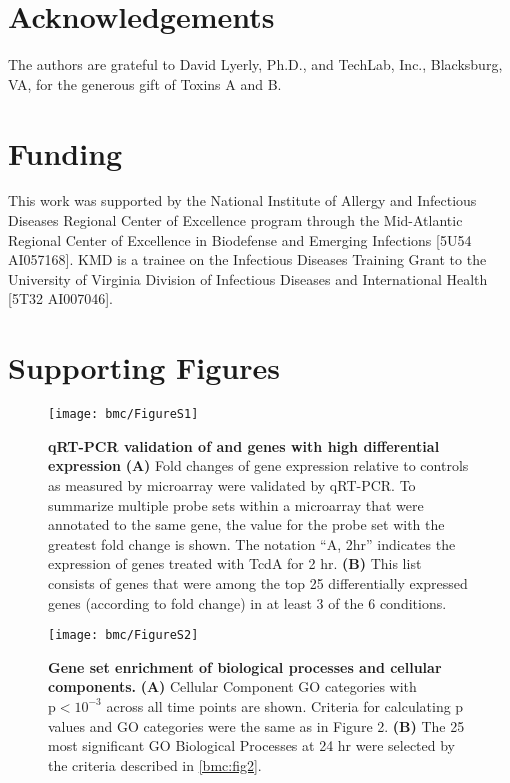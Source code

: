 \section{Acknowledgements}
The authors are grateful to David Lyerly, Ph.D., and TechLab, Inc., Blacksburg, VA, for the generous gift of Toxins A and B.

\section{Funding}
This work was supported by the National Institute of Allergy and Infectious Diseases Regional Center of Excellence program through the Mid-Atlantic Regional Center of Excellence in Biodefense and Emerging Infections [5U54 AI057168]. KMD is a trainee on the Infectious Diseases Training Grant to the University of Virginia Division of Infectious Diseases and International Health [5T32 AI007046].


\section{Supporting Figures}
\beginsupplement

\begin{figure}[h!]
  \centering
  \texttt{[image: bmc/FigureS1]}
  \caption[qRT-PCR validation of and genes with high differential expression]{
  \textbf{qRT-PCR validation of and genes with high differential expression}
  \textbf{(A)} Fold changes of gene expression relative to controls as measured by microarray 
were validated by qRT-PCR. To summarize multiple probe sets within a microarray that were annotated to the same gene, the value for the probe set with the 
greatest fold change is shown. The notation ``A, 2hr'' indicates the expression 
of genes treated with TcdA for 2 hr. 
\textbf{(B)} This list consists of genes that were among the top 25 differentially expressed 
genes (according to fold change) in at least 3 of the 6 conditions.}
  \label{bmc:figs1}
\end{figure}


\begin{sidewaysfigure}[h!]
  \centering
  \texttt{[image: bmc/FigureS2]}
  \caption[Gene set enrichment of biological processes and cellular components]{
  \textbf{Gene set enrichment of biological processes and cellular components.}
\textbf{(A)} Cellular Component GO categories with $\text{p}<10^{-3}$ across all time points are shown. Criteria for calculating p
values and GO categories were the same as in Figure 2.
\textbf{(B)} The 25 most significant GO Biological Processes at 24 hr were selected by the criteria described in \autoref{bmc:fig2}.}
  \label{bmc:figs2}
\end{sidewaysfigure}


